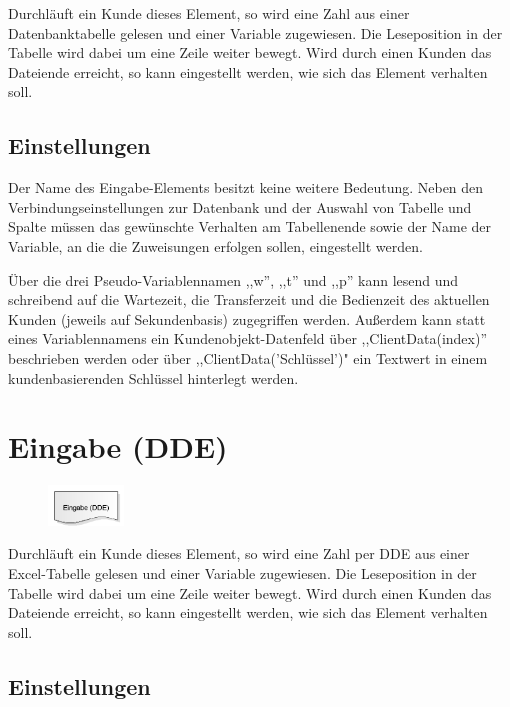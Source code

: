 Durchläuft ein Kunde dieses Element, so wird eine Zahl aus einer Datenbanktabelle gelesen und einer
Variable zugewiesen. Die Leseposition in der Tabelle wird dabei um eine Zeile weiter bewegt.
Wird durch einen Kunden das Dateiende erreicht, so kann eingestellt werden, wie sich
das Element verhalten soll.

\subsection*{Einstellungen}

Der Name des Eingabe-Elements besitzt keine weitere Bedeutung. Neben den Verbindungseinstellungen
zur Datenbank und der Auswahl von Tabelle und Spalte müssen das gewünschte Verhalten am Tabellenende
sowie der Name der Variable, an die die Zuweisungen erfolgen sollen, eingestellt werden.

Über die drei Pseudo-Variablennamen ,,w'', ,,t'' und ,,p'' kann lesend und schreibend auf die Wartezeit, die Transferzeit
und die Bedienzeit des aktuellen Kunden (jeweils auf Sekundenbasis) zugegriffen werden. Außerdem kann statt eines
Variablennamens ein Kundenobjekt-Datenfeld über ,,ClientData(index)'' beschrieben werden oder über ,,ClientData('Schlüssel')"
ein Textwert in einem kundenbasierenden Schlüssel hinterlegt werden.


\section{Eingabe (DDE)}
\label{ref:ModelElementInputDDE}

\begin{figure}
\vspace{-22pt}
\includegraphics[width=2cm]{imageModelElementInputDDE.png}
\vspace{-22pt}
\end{figure}

Durchläuft ein Kunde dieses Element, so wird eine Zahl per DDE aus einer Excel-Tabelle gelesen und einer
Variable zugewiesen. Die Leseposition in der Tabelle wird dabei um eine Zeile weiter bewegt.
Wird durch einen Kunden das Dateiende erreicht, so kann eingestellt werden, wie sich
das Element verhalten soll.

\subsection*{Einstellungen}

